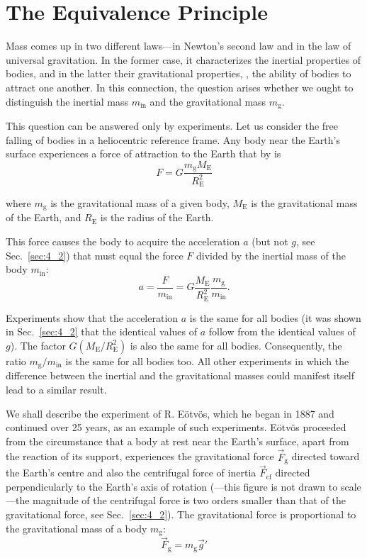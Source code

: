 \section{The Equivalence Principle}\label{sec:6_3}

Mass comes up in two different laws---in Newton's second law and in the law of universal gravitation. In the former case, it characterizes the inertial properties of bodies, and in the latter their gravitational properties, \ie, the ability of bodies to attract one another. In this connection, the question arises whether we ought to distinguish the inertial mass $m_{\text{in}}$ and the gravitational mass $m_{\text{g}}$.

This question can be answered only by experiments. Let us consider the free falling of bodies in a heliocentric reference frame. Any body near the Earth's surface experiences a force of attraction to the Earth that by  is
\begin{equation*}
	F = G\frac{m_{\text{g}} M_{\text{E}}}{R_{\text{E}}^2}
\end{equation*}

\noindent
where $m_{\text{g}}$ is the gravitational mass of a given body, $M_{\text{E}}$ is the gravitational mass of the Earth, and $R_{\text{E}}$ is the radius of the Earth.

This force causes the body to acquire the acceleration $a$ (but not $g$, see Sec.~\ref{sec:4_2}) that must equal the force $F$ divided by the inertial mass of the body $m_{\text{in}}$:
\begin{equation}\label{eq:6_20}
	a = \frac{F}{m_{\text{in}}} = G\frac{M_{\text{E}}}{R_{\text{E}}^2}\frac{m_{\text{g}}}{m_{\text{in}}}.
\end{equation}

Experiments show that the acceleration $a$ is the same for all bodies (it was shown in Sec.~\ref{sec:4_2} that the identical values of $a$ follow from the identical values of $g$). The factor $G(M_{\text{E}}/R_{\text{E}}^2)$ is also the same for all bodies. Consequently, the ratio $m_{\text{g}}/m_{\text{in}}$ is the same for all bodies too. All other experiments in which the difference between the inertial and the gravitational masses could manifest itself lead to a similar result.
	
We shall describe the experiment of R. E\"{o}tv\"{o}s, which he began in 1887 and continued over 25 years, as an example of such experiments. E\"{o}tv\"{o}s proceeded from the circumstance that a body at rest near the Earth's surface, apart from the reaction of its support, experiences the gravitational force $\vec{F}_{\text{g}}$ directed toward the Earth's centre and also the centrifugal force of inertia $\vec{F}_{\text{cf}}$ directed perpendicularly to the Earth's axis of rotation (---this figure is not drawn to scale---the magnitude of the centrifugal force is two orders smaller than that of the gravitational force, see Sec.~\ref{sec:4_2}). The gravitational force is proportional to the gravitational mass of a body $m_{\text{g}}$:
\begin{equation*}
	\vec{F}_{\text{g}} = m_{\text{g}}\vec{g}'
\end{equation*}

